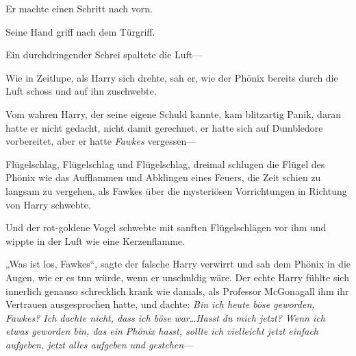 Er machte einen Schritt nach vorn.

Seine Hand griff nach dem Türgriff.

Ein durchdringender Schrei spaltete die Luft—

Wie in Zeitlupe, als Harry sich drehte, sah er, wie der Phönix bereits durch die Luft schoss und auf ihn zuschwebte.

Vom wahren Harry, der seine eigene Schuld kannte, kam blitzartig Panik, daran hatte er nicht gedacht, nicht damit gerechnet, er hatte sich auf Dumbledore vorbereitet, aber er hatte \emph{Fawkes} vergessen—

Flügelschlag, Flügelschlag und Flügelschlag, dreimal schlugen die Flügel des Phönix wie das Aufflammen und Abklingen eines Feuers, die Zeit schien zu langsam zu vergehen, als Fawkes über die mysteriösen Vorrichtungen in Richtung von Harry schwebte.

Und der rot-goldene Vogel schwebte mit sanften Flügelschlägen vor ihm und wippte in der Luft wie eine Kerzenflamme.

„Was ist los, Fawkes“, sagte der falsche Harry verwirrt und sah dem Phönix in die Augen, wie er es tun würde, wenn er unschuldig wäre. Der echte Harry fühlte sich innerlich genauso schrecklich krank wie damals, als Professor McGonagall ihm ihr Vertrauen ausgesprochen hatte, und dachte: \emph{Bin ich heute böse geworden, Fawkes? Ich dachte nicht, dass ich böse} \emph{war}…\emph{Hasst du mich jetzt? Wenn ich etwas geworden bin, das ein Phönix hasst, sollte ich vielleicht jetzt einfach aufgeben, jetzt alles aufgeben und gestehen}—

